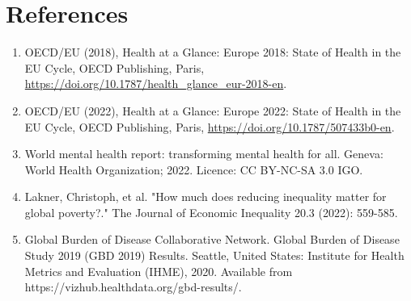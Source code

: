 \chapter{References}

\begin{enumerate}
    \item OECD/EU (2018), Health at a Glance: Europe 2018: State of Health in the EU Cycle, OECD Publishing, Paris,    \url{https://doi.org/10.1787/health_glance_eur-2018-en}.
    \item OECD/EU (2022), Health at a Glance: Europe 2022: State of Health in the EU Cycle, OECD Publishing, Paris, \url{https://doi.org/10.1787/507433b0-en}.
    \item World mental health report: transforming mental health for all. Geneva: World Health Organization; 2022. Licence: CC BY-NC-SA 3.0 IGO.
    \item Lakner, Christoph, et al. "How much does reducing inequality matter for global poverty?." The Journal of Economic Inequality 20.3 (2022): 559-585.
    \item Global Burden of Disease Collaborative Network. Global Burden of Disease Study 2019 (GBD 2019) Results. Seattle, United States: Institute for Health Metrics and Evaluation (IHME), 2020. Available from https://vizhub.healthdata.org/gbd-results/.
\end{enumerate}